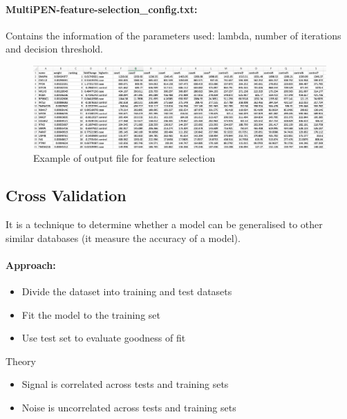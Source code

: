 \documentclass[11pt, oneside]{article}   	%
\begin{document}
\paragraph{MultiPEN-feature-selection\_config.txt:} Contains the information of the parameters used: lambda, number of iterations and decision threshold.



\begin{figure}[!h]
	\centering
	\includegraphics[width=\textwidth]{example_output_rankings}
	\caption{Example of output file for feature selection}
	\label{fig:example_output_rankings}
\end{figure}



\subsection{Cross Validation}

It is a technique to determine whether a model can be generalised to other similar databases (it measure the accuracy of a model).

\paragraph{Approach:}


\begin{itemize}

   \item Divide the dataset into training and test datasets
   
   \item Fit the model to the training set
   
   \item Use test set to evaluate goodness of fit
   
\end{itemize}


Theory

\begin{itemize}

   \item Signal is correlated across tests and training sets
   
   \item Noise is uncorrelated across tests and training sets
   
\end{itemize}
\end{document}
